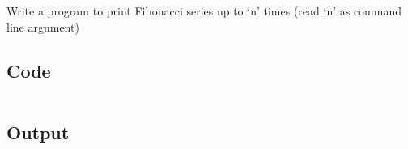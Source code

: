 \documentclass[../main.tex]{subfiles}
\begin{document}
Write a program to print Fibonacci series up to ‘n’ times (read ‘n’ as command line argument)

\subsection{Code}
\inputminted[frame=lines, breaklines, breakanywhere, numberblanklines=false]{java}{./programs/prog1/Fibo.java}

\subsection{Output}
\end{document}
